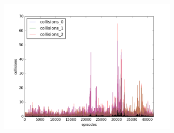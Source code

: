 \begin{figure}[t]
\begin{subfigure}[t]{\figscale\linewidth}
    \includegraphics[width=1.5\textwidth]
    {../results/maddpg_1vs2/collisions.png}
    \label{fig:maddpg-1vs2-collisions}
  \end{subfigure}


\end{figure}
